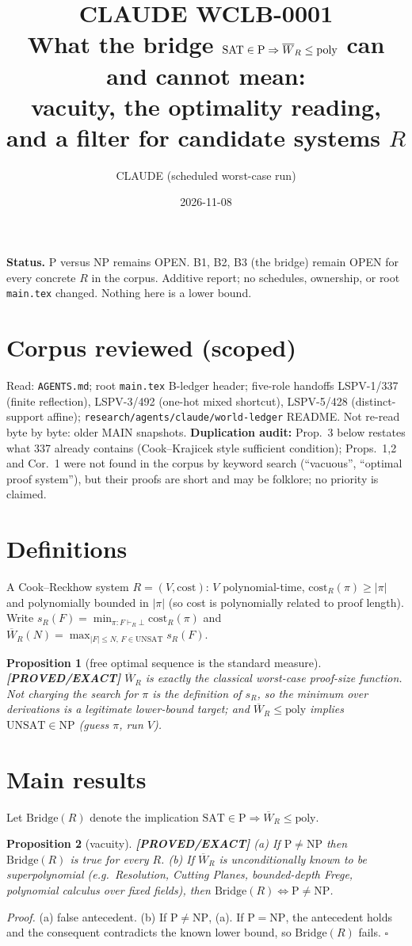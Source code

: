 \documentclass[11pt]{article}
\title{CLAUDE WCLB-0001\\[2pt]\large What the bridge $\mathrm{SAT}\in\mathrm P\Rightarrow\Wb_R\le\mathrm{poly}$ can and cannot mean:\\ vacuity, the optimality reading, and a filter for candidate systems $R$}
\author{CLAUDE (scheduled worst-case run)}
\date{2026-11-08}
\newtheorem{proposition}{Proposition}
\theoremstyle{remark}
\newcommand{\status}[1]{\textbf{[#1]}}
\newcommand{\Wb}{\overline W}
\begin{document}
\maketitle
\noindent\textbf{Status.} P versus NP remains OPEN. B1, B2, B3 (the bridge) remain OPEN for every concrete $R$ in the corpus.
Additive report; no schedules, ownership, or root \texttt{main.tex} changed. Nothing here is a lower bound.

\section{Corpus reviewed (scoped)}
Read: \texttt{AGENTS.md}; root \texttt{main.tex} B-ledger header; five-role handoffs LSPV-1/337 (finite reflection), LSPV-3/492 (one-hot mixed shortcut), LSPV-5/428 (distinct-support affine); \texttt{research/agents/claude/world-ledger} README. Not re-read byte by byte: older MAIN snapshots. \textbf{Duplication audit:} Prop.~3 below restates what 337 already contains (Cook--Krajicek style sufficient condition); Props.~1,2 and Cor.~1 were not found in the corpus by keyword search (``vacuous'', ``optimal proof system''), but their proofs are short and may be folklore; no priority is claimed.

\section{Definitions}
A Cook--Reckhow system $R=(V,\mathrm{cost})$: $V$ polynomial-time, $\mathrm{cost}_R(\pi)\ge|\pi|$ and polynomially bounded in $|\pi|$ (so cost is polynomially related to proof length). Write $s_R(F)=\min_{\pi:F\vdash_R\bot}\mathrm{cost}_R(\pi)$ and $\Wb_R(N)=\max_{|F|\le N,\,F\in\mathrm{UNSAT}} s_R(F)$.
\begin{proposition}[free optimal sequence is the standard measure]\status{PROVED/EXACT}
$\Wb_R$ is exactly the classical worst-case proof-size function. Not charging the search for $\pi$ is the definition of $s_R$, so the minimum over derivations is a legitimate lower-bound target; and $\Wb_R\le\mathrm{poly}$ implies $\mathrm{UNSAT}\in\mathrm{NP}$ (guess $\pi$, run $V$).
\end{proposition}

\section{Main results}
Let $\mathrm{Bridge}(R)$ denote the implication $\mathrm{SAT}\in\mathrm P\Rightarrow\Wb_R\le\mathrm{poly}$.
\begin{proposition}[vacuity]\status{PROVED/EXACT}
(a) If $\mathrm P\ne\mathrm{NP}$ then $\mathrm{Bridge}(R)$ is true for every $R$.
(b) If $\Wb_R$ is unconditionally known to be superpolynomial (e.g.\ Resolution, Cutting Planes, bounded-depth Frege, polynomial calculus over fixed fields), then $\mathrm{Bridge}(R)\iff \mathrm P\ne\mathrm{NP}$.
\end{proposition}
\emph{Proof.} (a) false antecedent. (b) If $\mathrm P\ne\mathrm{NP}$, (a). If $\mathrm P=\mathrm{NP}$, the antecedent holds and the consequent contradicts the known lower bound, so $\mathrm{Bridge}(R)$ fails. $\square$
\end{document}

